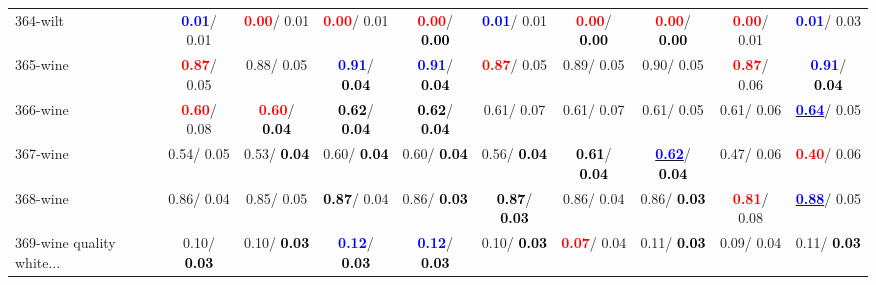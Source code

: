 \begin{table}[h]
\begin{center}
{\begin{tabular}{lc|c|c|c|c|c|c|c|c}
364-wilt & \textcolor{blue}{\textbf{  0.01}}/  0.01 & \textcolor{red}{\textbf{  0.00}}/  0.01 & \textcolor{red}{\textbf{  0.00}}/  0.01 & \textcolor{red}{\textbf{  0.00}}/\textcolor{black}{\textbf{  0.00}} & \textcolor{blue}{\textbf{  0.01}}/  0.01 & \textcolor{red}{\textbf{  0.00}}/\textcolor{black}{\textbf{  0.00}} & \textcolor{red}{\textbf{  0.00}}/\textcolor{black}{\textbf{  0.00}} & \textcolor{red}{\textbf{  0.00}}/  0.01 & \textcolor{blue}{\textbf{  0.01}}/  0.03 \\
365-wine & \textcolor{red}{\textbf{  0.87}}/  0.05 &   0.88/  0.05 & \textcolor{blue}{\textbf{  0.91}}/\textcolor{black}{\textbf{  0.04}} & \textcolor{blue}{\textbf{  0.91}}/\textcolor{black}{\textbf{  0.04}} & \textcolor{red}{\textbf{  0.87}}/  0.05 &   0.89/  0.05 &   0.90/  0.05 & \textcolor{red}{\textbf{  0.87}}/  0.06 & \textcolor{blue}{\textbf{  0.91}}/\textcolor{black}{\textbf{  0.04}} \\
366-wine & \textcolor{red}{\textbf{  0.60}}/  0.08 & \textcolor{red}{\textbf{  0.60}}/\textcolor{black}{\textbf{  0.04}} & \textcolor{black}{\textbf{  0.62}}/\textcolor{black}{\textbf{  0.04}} & \textcolor{black}{\textbf{  0.62}}/\textcolor{black}{\textbf{  0.04}} &   0.61/  0.07 &   0.61/  0.07 &   0.61/  0.05 &   0.61/  0.06 & \underline{\textcolor{blue}{\textbf{  0.64}}}/  0.05 \\ \hline
367-wine &   0.54/  0.05 &   0.53/\textcolor{black}{\textbf{  0.04}} &   0.60/\textcolor{black}{\textbf{  0.04}} &   0.60/\textcolor{black}{\textbf{  0.04}} &   0.56/\textcolor{black}{\textbf{  0.04}} & \textcolor{black}{\textbf{  0.61}}/\textcolor{black}{\textbf{  0.04}} & \underline{\textcolor{blue}{\textbf{  0.62}}}/\textcolor{black}{\textbf{  0.04}} &   0.47/  0.06 & \textcolor{red}{\textbf{  0.40}}/  0.06 \\
368-wine &   0.86/  0.04 &   0.85/  0.05 & \textcolor{black}{\textbf{  0.87}}/  0.04 &   0.86/\textcolor{black}{\textbf{  0.03}} & \textcolor{black}{\textbf{  0.87}}/\textcolor{black}{\textbf{  0.03}} &   0.86/  0.04 &   0.86/\textcolor{black}{\textbf{  0.03}} & \textcolor{red}{\textbf{  0.81}}/  0.08 & \underline{\textcolor{blue}{\textbf{  0.88}}}/  0.05 \\
369-wine quality white... &   0.10/\textcolor{black}{\textbf{  0.03}} &   0.10/\textcolor{black}{\textbf{  0.03}} & \textcolor{blue}{\textbf{  0.12}}/\textcolor{black}{\textbf{  0.03}} & \textcolor{blue}{\textbf{  0.12}}/\textcolor{black}{\textbf{  0.03}} &   0.10/\textcolor{black}{\textbf{  0.03}} & \textcolor{red}{\textbf{  0.07}}/  0.04 &   0.11/\textcolor{black}{\textbf{  0.03}} &   0.09/  0.04 &   0.11/\textcolor{black}{\textbf{  0.03}} \\

\end{tabular}}
\end{center}
\end{table}
